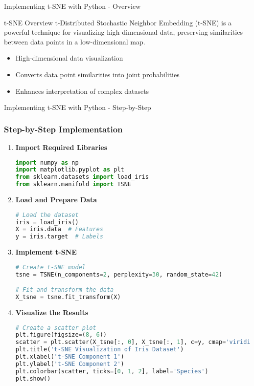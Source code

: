 \documentclass[aspectratio=169]{beamer}
\begin{document}
\begin{frame}[fragile]{Implementing t-SNE with Python - Overview}
  \begin{block}{t-SNE Overview}
    t-Distributed Stochastic Neighbor Embedding (t-SNE) is a powerful technique for visualizing high-dimensional data, preserving similarities between data points in a low-dimensional map. 
  \end{block}
  
  \begin{itemize}
    \item High-dimensional data visualization
    \item Converts data point similarities into joint probabilities
    \item Enhances interpretation of complex datasets
  \end{itemize}
\end{frame}

\begin{frame}[fragile]{Implementing t-SNE with Python - Step-by-Step}
  \frametitle{Step-by-Step Implementation}

  \begin{enumerate}
    \item \textbf{Import Required Libraries}
      \begin{lstlisting}[language=Python]
import numpy as np
import matplotlib.pyplot as plt
from sklearn.datasets import load_iris
from sklearn.manifold import TSNE
      \end{lstlisting}

    \item \textbf{Load and Prepare Data}
      \begin{lstlisting}[language=Python]
# Load the dataset
iris = load_iris()
X = iris.data  # Features
y = iris.target  # Labels
      \end{lstlisting}

    \item \textbf{Implement t-SNE}
      \begin{lstlisting}[language=Python]
# Create t-SNE model
tsne = TSNE(n_components=2, perplexity=30, random_state=42)

# Fit and transform the data
X_tsne = tsne.fit_transform(X)
      \end{lstlisting}

    \item \textbf{Visualize the Results}
      \begin{lstlisting}[language=Python]
# Create a scatter plot
plt.figure(figsize=(8, 6))
scatter = plt.scatter(X_tsne[:, 0], X_tsne[:, 1], c=y, cmap='viridis')
plt.title('t-SNE Visualization of Iris Dataset')
plt.xlabel('t-SNE Component 1')
plt.ylabel('t-SNE Component 2')
plt.colorbar(scatter, ticks=[0, 1, 2], label='Species')
plt.show()
      \end{lstlisting}
  \end{enumerate}
\end{frame}
\end{document}
